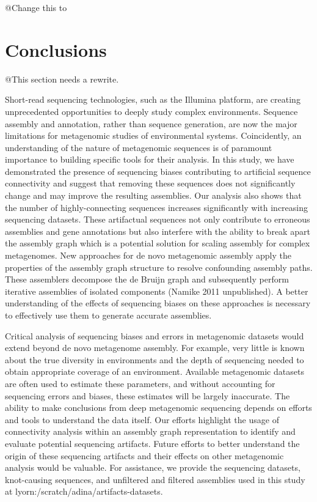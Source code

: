 \documentclass[11pt]{article} %
\begin{document}
@Change this to %



\section{Conclusions}

@This section needs a rewrite.  

Short-read sequencing technologies, such as the Illumina platform, are creating unprecedented opportunities to deeply study complex environments.  Sequence assembly and annotation, rather than sequence generation, are now the major limitations for metagenomic studies of environmental systems.  Coincidently, an understanding of the nature of metagenomic sequences is of paramount importance to building specific tools for their analysis.  In this study, we have demonstrated the presence of sequencing biases contributing to artificial sequence connectivity and suggest that removing these sequences does not significantly change and may improve the resulting assemblies. Our analysis also shows that the number of highly-connecting sequences increases significantly with increasing sequencing datasets.  These artifactual sequences not only contribute to erroneous assemblies and gene annotations but also interfere with the ability to break apart the assembly graph which is a potential solution for scaling assembly for complex metagenomes. New approaches for de novo metagenomic assembly apply the properties of the assembly graph structure to resolve confounding assembly paths. These assemblers decompose the de Bruijn graph and subsequently perform iterative assemblies of isolated components \cite{Peng:2011p898} (Namike 2011 unpublished).  A better understanding of the effects of sequencing biases on these approaches is necessary to effectively use them to generate accurate assemblies.  

	Critical analysis of sequencing biases and errors in metagenomic datasets would extend beyond de novo metagenome assembly.  For example, very little is known about the true diversity in environments and the depth of sequencing needed to obtain appropriate coverage of an environment.  Available metagenomic datasets are often used to estimate these parameters, and without accounting for sequencing errors and biases, these estimates will be largely inaccurate.  The ability to make conclusions from deep metagenomic sequencing depends on efforts and tools to understand the data itself.  Our efforts highlight the usage of connectivity analysis within an assembly graph representation to identify and evaluate potential sequencing artifacts.  Future efforts to better understand the origin of these sequencing artifacts and their effects on other metagenomic analysis would be valuable.  For assistance, we provide the sequencing datasets, knot-causing sequences, and unfiltered and filtered assemblies used in this study at lyorn:/scratch/adina/artifacts-datasets.
	
\end{document}
